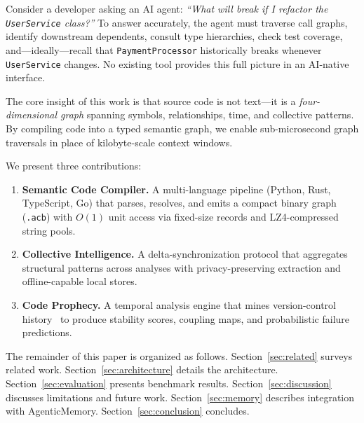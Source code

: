 \documentclass[10pt, twocolumn]{article}
\newcommand{\acbfile}{\texttt{.acb}\xspace}
\begin{document}
Consider a developer asking an AI agent: \emph{``What will break if I refactor the \texttt{UserService} class?''} To answer accurately, the agent must traverse call graphs, identify downstream dependents, consult type hierarchies, check test coverage, and---ideally---recall that \texttt{PaymentProcessor} historically breaks whenever \texttt{UserService} changes. No existing tool provides this full picture in an AI-native interface.

The core insight of this work is that source code is not text---it is a \emph{four-dimensional graph} spanning symbols, relationships, time, and collective patterns. By compiling code into a typed semantic graph, we enable sub-microsecond graph traversals in place of kilobyte-scale context windows.

We present three contributions:

\begin{enumerate}[leftmargin=*, itemsep=2pt]
\item \textbf{Semantic Code Compiler.} A multi-language pipeline (Python, Rust, TypeScript, Go) that parses, resolves, and emits a compact binary graph (\acbfile) with $O(1)$ unit access via fixed-size records and LZ4-compressed~\cite{collet2013lz4} string pools.
\item \textbf{Collective Intelligence.} A delta-synchronization protocol that aggregates structural patterns across analyses with privacy-preserving extraction and offline-capable local stores.
\item \textbf{Code Prophecy.} A temporal analysis engine that mines version-control history~\cite{git2005} to produce stability scores, coupling maps, and probabilistic failure predictions.
\end{enumerate}

The remainder of this paper is organized as follows. Section~\ref{sec:related} surveys related work. Section~\ref{sec:architecture} details the architecture. Section~\ref{sec:evaluation} presents benchmark results. Section~\ref{sec:discussion} discusses limitations and future work. Section~\ref{sec:memory} describes integration with AgenticMemory. Section~\ref{sec:conclusion} concludes.
\end{document}
